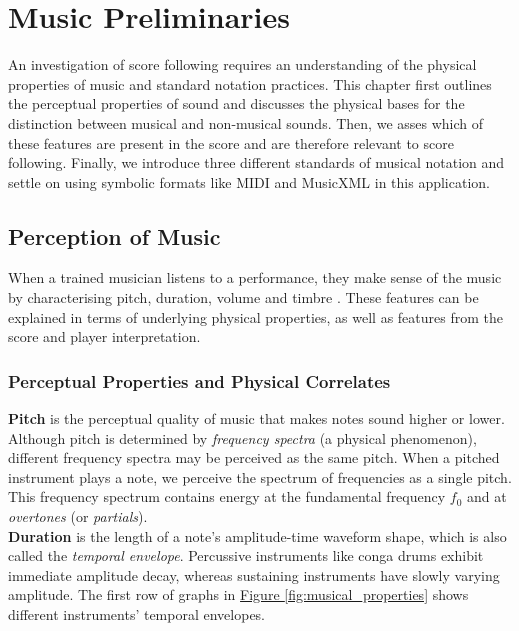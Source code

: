 \chapter{Music Preliminaries}{\label{ch:music_preliminaries}}

An investigation of score following requires an understanding of the physical properties of music and standard notation practices. This chapter first outlines the perceptual properties of sound and discusses the physical bases for the distinction between musical and non-musical sounds. Then, we asses which of these features are present in the score and are therefore relevant to score following. Finally, we introduce three different standards of musical notation and settle on using symbolic formats like MIDI and MusicXML in this application.


\section{Perception of Music}{\label{subsection:perception_of_music}}
When a trained musician listens to a performance, they make sense of the music by characterising pitch, duration, volume and \gls{timbre} \cite{donnelly_2015_learning}. These features can be explained in terms of underlying physical properties, as well as features from the score and player interpretation. 

\subsection{Perceptual Properties and Physical Correlates}{\label{section:duration}}

\textbf{Pitch} is the perceptual quality of music that makes notes sound higher or lower. Although pitch is determined by \textit{frequency spectra} (a physical phenomenon), different frequency spectra may be perceived as the same pitch. When a pitched instrument plays a note, we perceive the spectrum of frequencies as a single pitch. This frequency spectrum contains energy at the fundamental frequency $f_0$ and at \textit{overtones} (or \textit{partials}). \\ %

\textbf{Duration} is the length of a note’s amplitude-time waveform shape, which is also called the \textit{temporal envelope}. Percussive instruments like conga drums exhibit immediate amplitude decay, whereas sustaining instruments have slowly varying amplitude. The first row of graphs in \hyperref[fig:musical_properties]{Figure \ref*{fig:musical_properties}} shows different instruments' temporal envelopes. \\

